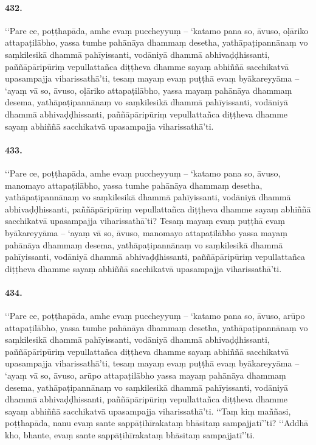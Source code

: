 \paragraph{432.} ‘‘Pare ce, poṭṭhapāda, amhe evaṃ puccheyyuṃ – ‘katamo pana so, āvuso, oḷāriko attapaṭilābho, yassa tumhe pahānāya dhammaṃ desetha, yathāpaṭipannānaṃ vo saṃkilesikā dhammā pahīyissanti, vodāniyā dhammā abhivaḍḍhissanti, paññāpāripūriṃ vepullattañca diṭṭheva dhamme sayaṃ abhiññā sacchikatvā upasampajja viharissathā’ti, tesaṃ mayaṃ evaṃ puṭṭhā evaṃ byākareyyāma – ‘ayaṃ vā so, āvuso, oḷāriko attapaṭilābho, yassa mayaṃ pahānāya dhammaṃ desema, yathāpaṭipannānaṃ vo saṃkilesikā dhammā pahīyissanti, vodāniyā dhammā abhivaḍḍhissanti, paññāpāripūriṃ vepullattañca diṭṭheva dhamme sayaṃ abhiññā sacchikatvā upasampajja viharissathā’ti.

\paragraph{433.} ‘‘Pare ce, poṭṭhapāda, amhe evaṃ puccheyyuṃ – ‘katamo pana so, āvuso, manomayo attapaṭilābho, yassa tumhe pahānāya dhammaṃ desetha, yathāpaṭipannānaṃ vo saṃkilesikā dhammā pahīyissanti, vodāniyā dhammā abhivaḍḍhissanti, paññāpāripūriṃ vepullattañca diṭṭheva dhamme sayaṃ abhiññā sacchikatvā upasampajja viharissathā’ti? Tesaṃ mayaṃ evaṃ puṭṭhā evaṃ byākareyyāma – ‘ayaṃ vā so, āvuso, manomayo attapaṭilābho yassa mayaṃ pahānāya dhammaṃ desema, yathāpaṭipannānaṃ vo saṃkilesikā dhammā pahīyissanti, vodāniyā dhammā abhivaḍḍhissanti, paññāpāripūriṃ vepullattañca diṭṭheva dhamme sayaṃ abhiññā sacchikatvā upasampajja viharissathā’ti.

\paragraph{434.} ‘‘Pare ce, poṭṭhapāda, amhe evaṃ puccheyyuṃ – ‘katamo pana so, āvuso, arūpo attapaṭilābho, yassa tumhe pahānāya dhammaṃ desetha, yathāpaṭipannānaṃ vo saṃkilesikā dhammā pahīyissanti, vodāniyā dhammā abhivaḍḍhissanti, paññāpāripūriṃ vepullattañca diṭṭheva dhamme sayaṃ abhiññā sacchikatvā upasampajja viharissathā’ti, tesaṃ mayaṃ evaṃ puṭṭhā evaṃ byākareyyāma – ‘ayaṃ vā so, āvuso, arūpo attapaṭilābho yassa mayaṃ pahānāya dhammaṃ desema, yathāpaṭipannānaṃ vo saṃkilesikā dhammā pahīyissanti, vodāniyā dhammā abhivaḍḍhissanti, paññāpāripūriṃ vepullattañca diṭṭheva dhamme sayaṃ abhiññā sacchikatvā upasampajja viharissathā’ti. ‘‘Taṃ kiṃ maññasi, poṭṭhapāda, nanu evaṃ sante sappāṭihīrakataṃ bhāsitaṃ sampajjatī’’ti? ‘‘Addhā kho, bhante, evaṃ sante sappāṭihīrakataṃ bhāsitaṃ sampajjatī’’ti.


